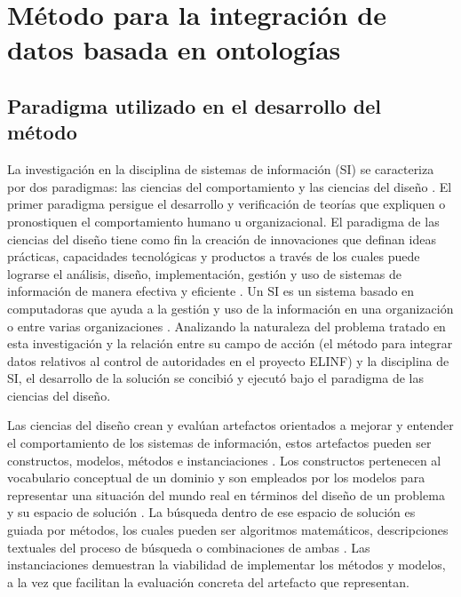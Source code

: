 \chapter{\large Método para la integración de datos basada en ontologías}


\pagestyle{fancy}
\lhead{}
\chead{}
\lfoot{}
\cfoot{}
\rfoot{\thepage}
\renewcommand{\headrulewidth}{0.4pt}
 \vspace{-1cm}

\section{Paradigma utilizado en el desarrollo del método}
La investigación en la disciplina de sistemas de información (SI) se caracteriza por dos paradigmas: las ciencias del comportamiento y las ciencias del diseño \citep{Hevner:2004:DSI:2017212.2017217}. El primer paradigma persigue el desarrollo y verificación de teorías que expliquen o pronostiquen el comportamiento humano u organizacional. El paradigma de las ciencias del diseño tiene como fin la creación de innovaciones que definan ideas prácticas, capacidades tecnológicas y productos a través de los cuales puede lograrse el análisis, diseño, implementación, gestión y uso de sistemas de información de manera efectiva y eficiente \citep{Denning:1997:NSC:253671.253755}. Un SI es un sistema basado en computadoras que ayuda a la gestión y uso de la información en una organización o entre varias organizaciones \citep{GarciaNoguera2009}. Analizando la naturaleza del problema tratado en esta investigación y la relación entre su campo de acción (el método para integrar datos relativos al control de autoridades en el proyecto ELINF) y la disciplina de SI, el desarrollo de la solución se concibió y ejecutó bajo el paradigma de las ciencias del diseño.

Las ciencias del diseño crean y evalúan artefactos orientados a mejorar y entender el comportamiento de los sistemas de información, estos artefactos pueden ser constructos, modelos, métodos e instanciaciones \citep{March:1995:DNS:1700865.1700867}. Los constructos pertenecen al vocabulario conceptual de un dominio y son empleados por los modelos para representar una situación del mundo real en términos del diseño de un problema y su espacio de solución \citep{Simon:1996:SA:237774}. La búsqueda dentro de ese espacio de solución es guiada por métodos, los cuales pueden ser algoritmos matemáticos, descripciones textuales del proceso de búsqueda o combinaciones de ambas \citep{Hevner:2004:DSI:2017212.2017217}. Las instanciaciones demuestran la viabilidad de implementar los métodos y modelos, a la vez que facilitan la evaluación concreta del artefacto que representan.

